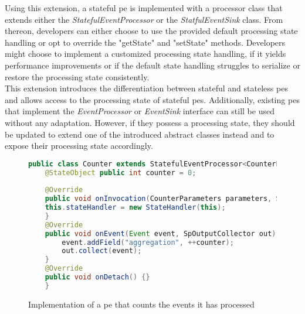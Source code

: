 Using this extension, a stateful \gls{pe} is implemented with a processor class that extends either the \textit{StatefulEventProcessor} or the \textit{StatfulEventSink} class. From thereon, developers can either choose to use the provided default processing state handling or opt to override the "getState" and "setState" methods. Developers might choose to implement a customized processing state handling, if it yields performance improvements or if the default state handling struggles to serialize or restore the processing state consistently.\\
This extension introduces the differentiation between stateful and stateless \gls{pe}s and allows access to the processing state of stateful \gls{pe}s. Additionally, existing \gls{pe}s that implement the \textit{EventProcessor} or \textit{EventSink} interface can still be used without any adaptation. However, if they possess a processing state, they should be updated to extend one of the introduced abstract classes instead and to expose their processing state accordingly.\par

\begin{figure}[H]
    \begin{lstlisting}[language=Java]
    public class Counter extends StatefulEventProcessor<CounterParameters> {
    @StateObject public int counter = 0;
    
    @Override
    public void onInvocation(CounterParameters parameters, SpOutputCollector spOutputCollector, EventProcessorRuntimeContext runtimeContext) { 
    this.stateHandler = new StateHandler(this);
    }
    @Override
    public void onEvent(Event event, SpOutputCollector out) {
        event.addField("aggregation", ++counter);
        out.collect(event);
    }
    @Override
    public void onDetach() {}
    }
    \end{lstlisting}
    \caption{Implementation of a \gls{pe} that counts the events it has processed}
    \label{fCounterImplementation}
\end{figure}


